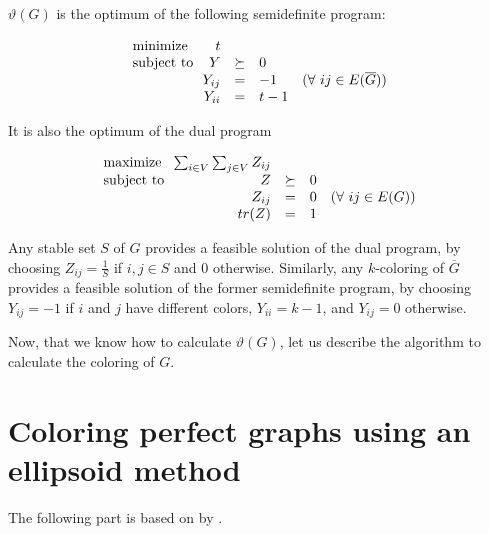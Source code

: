 \begin{theorem}
  $\vartheta(G)$ is the optimum of the following semidefinite program:

  \begin{equation*}
    \begin{array}{l@{}rlll}
      \text{minimize~~}   & t      &                                              \\
      \text{subject to~~} & Y      & \succeq & 0                                    \\
                        & Y_{ij} & = & -1      & (\forall~ij \in E(\overline{G})) \\
                        & Y_{ii} & = & t - 1                                      \\
    \end{array}
  \end{equation*}

  It is also the optimum of the dual program

  \begin{equation*}
    \begin{array}{l@{}rlll}
      \text{maximize~~}   & \sum_{i \in V} \sum_{j \in V}  Z_{ij} &                                     \\
      \text{subject to~~} & Z                                     & \succeq & 0                         \\
                          & Z_{ij}                                & =       & 0 & (\forall~ij \in E(G)) \\
                          & tr(Z)                                 & =       & 1                         \\
    \end{array}
  \end{equation*}
\end{theorem}

Any stable set $S$ of $G$ provides a feasible solution of the dual program, by choosing $Z_{ij} = \frac{1}{S}$ if $i, j \in S$ and 0 otherwise. Similarly, any $k$-coloring of $\overline{G}$ provides a feasible solution of the former semidefinite program, by choosing $Y_{ij} = -1$ if $i$ and $j$ have different colors, $Y_{ii} = k-1$, and $Y_{ij} = 0$ otherwise.

Now, that we know how to calculate $\vartheta(G)$, let us describe the algorithm to calculate the coloring of $G$.

\section{Coloring perfect graphs using an ellipsoid method}
\label{sec:coloringEllipsoid}
The following part is based on  by \citeauthor{Laurent2005} \cite{Laurent2005}.

